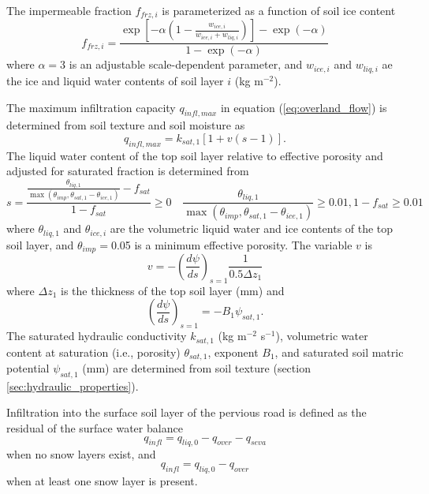 \documentclass[12pt,authoryear]{elsarticle}
\numberwithin{equation}{section} %
\begin{document}
The impermeable fraction $f_{frz,i}$ is parameterized as a function of soil ice content \citep{niuEffectsFrozenSoil2006}
\begin{equation}
\label{eq:impermeable_fraction}
f_{frz,i}=\frac{\exp\left[-\alpha \left(1-\frac{w_{ice,i}}{w_{ice,i}+w_{liq,i}}\right)\right]-\exp(-\alpha)}{1-\exp(-\alpha)}
\end{equation}
where $\alpha=$3 is an adjustable scale-dependent parameter, and $w_{ice,i}$ and $w_{liq,i}$ ae the ice and liquid water contents of soil layer $i$ (kg m$^{-2}$).

The maximum infiltration capacity $q_{infl,max}$ in equation (\ref{eq:overland_flow}) is determined from soil texture and soil moisture \citep{entekhabiLandSurfaceHydrology1989} as
\begin{equation}
q_{infl,max} = k_{sat,1}\left[1+v(s-1)\right].
\end{equation}
The liquid water content of the top soil layer relative to effective porosity and adjusted for saturated fraction is determined from
\begin{equation}
s = \frac{\frac{\theta_{liq,1}}{\max(\theta_{imp},\theta_{sat,1}-\theta_{ice,1})}-f_{sat}}{1-f_{sat}} \geq 0 \quad \frac{\theta_{liq,1}}{\max(\theta_{imp},\theta_{sat,1}-\theta_{ice,1})} \geq 0.01, 1-f_{sat} \geq 0.01
\end{equation}
where $\theta_{liq,1}$ and $\theta_{ice,i}$ are the volumetric liquid water and ice contents of the top soil layer, and $\theta_{imp}=$0.05 is a minimum effective porosity. The variable $v$ is 
\begin{equation}
v=-\left(\frac{d\psi}{ds}\right)_{s=1}\frac{1}{0.5\Delta z_{1}}
\end{equation}
where $\Delta z_{1}$ is the thickness of the top soil layer (mm) and
\begin{equation}
\left(\frac{d\psi}{ds}\right)_{s=1} = -B_{1}\psi_{sat,1}.
\end{equation}
The saturated hydraulic conductivity $k_{sat,1}$ (kg m$^{-2}$ s$^{-1}$), volumetric water content at saturation (i.e., porosity)
$\theta_{sat,1}$, \cite{clappEmpiricalEquationsSoil1978} exponent $B_{1}$, and saturated soil matric potential $\psi_{sat,1}$ (mm) are determined from soil texture (section \ref{sec:hydraulic_properties}).

Infiltration into the surface soil layer of the pervious road is defined as the residual of the surface water balance
\begin{equation}
q_{infl} = q_{liq,0}-q_{over}-q_{seva}
\end{equation}
when no snow layers exist, and
\begin{equation}
q_{infl} = q_{liq,0}-q_{over}
\end{equation}
when at least one snow layer is present.
\end{document}
